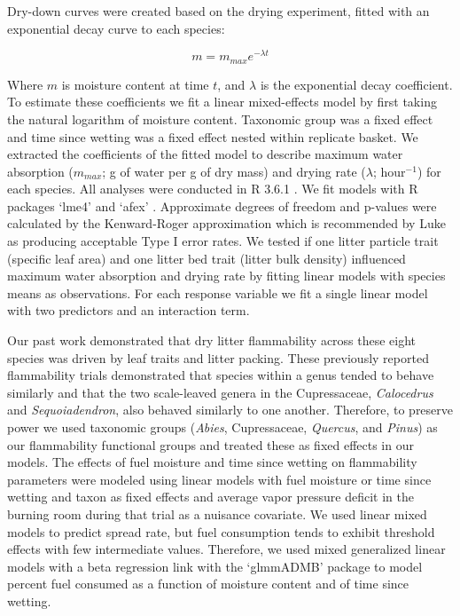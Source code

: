 \documentclass[letterpaper,12pt]{article}
\begin{document}
Dry-down curves were created based on the drying experiment, fitted with an
exponential decay curve to each species:

\begin{equation}
m = m_{max} e^{-\lambda t}
\end{equation}

Where $m$ is moisture content at time $t$, and $\lambda$ is the exponential
decay coefficient. To estimate these coefficients we fit a linear mixed-effects
model by first taking the natural logarithm of moisture content. Taxonomic
group was a fixed effect and time since wetting was a fixed effect nested
within replicate basket. We extracted the coefficients of the fitted model to
describe maximum water absorption ($m_{max}$; g of water per g of dry mass) and
drying rate ($\lambda$; hour$^{-1}$) for each species. All analyses were
conducted in R 3.6.1 \citep{RCoreTeam-2019}. We fit models with R packages
`lme4' \citep{Bates_Machler_etal-2015} and `afex'
\citep{Singmann_Bolker_etal-2017}. Approximate degrees of freedom and p-values
were calculated by the Kenward-Roger approximation \citep{Kenward_Roger-1997}
which is recommended by Luke \citeyear{Luke-2017} as producing acceptable Type
I error rates. We tested if one litter particle trait (specific leaf area) and
one litter bed trait (litter bulk density) influenced maximum water absorption
and drying rate by fitting linear models with species means as observations.
For each response variable we fit a single linear model with two predictors and
an interaction term.

Our past work \citep{Magalhaes+Schwilk-2012} demonstrated that dry litter
flammability across these eight species was driven by leaf traits and litter
packing. These previously reported flammability trials demonstrated that
species within a genus tended to behave similarly and that the two scale-leaved
genera in the Cupressaceae, \emph{Calocedrus} and \emph{Sequoiadendron}, also
behaved similarly to one another. Therefore, to preserve power we used
taxonomic groups (\emph{Abies}, Cupressaceae, \emph{Quercus}, and \emph{Pinus})
as our flammability functional groups and treated these as fixed effects in our
models. The effects of fuel moisture and time since wetting on flammability
parameters were modeled using linear models with fuel moisture or time since
wetting and taxon as fixed effects and average vapor pressure deficit in the
burning room during that trial as a nuisance covariate. We used linear mixed
models to predict spread rate, but fuel consumption tends to exhibit threshold
effects with few intermediate values. Therefore, we used mixed generalized
linear models with a beta regression link with the `glmmADMB' package
\citep{Skaug_Fournier_etal-2016} to model percent fuel consumed as a function
of moisture content and of time since wetting.
\end{document}

